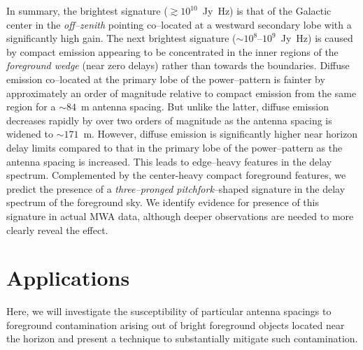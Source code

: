 \documentclass[preprint2,iop,numberedappendix]{emulateapj}
\begin{document}
In summary, the brightest signature ($\gtrsim 10^{10}$~Jy~Hz) is that of the Galactic center in the {\it off--zenith} pointing co--located at a westward secondary lobe with a significantly high gain. The next brightest signature ($\sim 10^8$--$10^9$~Jy~Hz) is caused by compact emission appearing to be concentrated in the inner regions of the {\it foreground wedge} (near zero delays) rather than towards the boundaries. Diffuse emission co--located at the primary lobe of the power--pattern is fainter by approximately an order of magnitude relative to compact emission from the same region for a $\sim 84$~m antenna spacing. But unlike the latter, diffuse emission decreases rapidly by over two orders of magnitude as the antenna spacing is widened to $\sim 171$~m. However, diffuse emission is significantly higher near horizon delay limits compared to that in the primary lobe of the power--pattern as the antenna spacing is increased. This leads to edge--heavy features in the delay spectrum. Complemented by the center-heavy compact foreground features, we predict the presence of a {\it three--pronged pitchfork}--shaped signature in the delay spectrum of the foreground sky. We identify evidence for presence of this signature in actual MWA data, although deeper observations are needed to more clearly reveal the effect.

\section{Applications}\label{sec:fg-grading}


Here, we will investigate the susceptibility of particular antenna spacings to foreground contamination arising out of bright foreground objects located near the horizon and present a technique to substantially mitigate such contamination.
\end{document}
